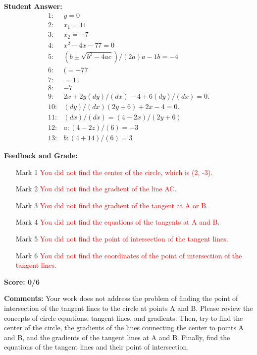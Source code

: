 \documentclass{article}
\begin{document}
\textbf{Student Answer:}
\begin{align*}
1: & y=0 \\
2: & x_1=11 \\
3: & x_2=-7 \\
4: & x^{2}-4x-77=0 \\
5: & (b\pm\sqrt{b^{2}-4ac})/(2a)a-1b=-4 \\
6: & (=-77 \\
7: & =11 \\
8: & -7 \\
9: & 2x+2y(dy)/(dx)-4+6(dy)/(dx)=0. \\
10: & (dy)/(dx)(2y+6)+2x-4=0. \\
11: & (dx)/(dx)=(4-2x)/(2y+6) \\
12: & a:(4-2z)/(6)=-3 \\
13: & b:(4+14)/(6)=3
\end{align*}

\textbf{Feedback and Grade:}
\begin{itemize}
\item[Mark 1] \textcolor{red}{You did not find the center of the circle, which is (2, -3).}
\item[Mark 2] \textcolor{red}{You did not find the gradient of the line AC.}
\item[Mark 3] \textcolor{red}{You did not find the gradient of the tangent at A or B.}
\item[Mark 4] \textcolor{red}{You did not find the equations of the tangents at A and B.}
\item[Mark 5] \textcolor{red}{You did not find the point of intersection of the tangent lines.}
\item[Mark 6] \textcolor{red}{You did not find the coordinates of the point of intersection of the tangent lines.}
\end{itemize}

\textbf{Score: 0/6}

\textbf{Comments:} Your work does not address the problem of finding the point of intersection of the tangent lines to the circle at points A and B. Please review the concepts of circle equations, tangent lines, and gradients. Then, try to find the center of the circle, the gradients of the lines connecting the center to points A and B, and the gradients of the tangent lines at A and B. Finally, find the equations of the tangent lines and their point of intersection.
\end{document}
